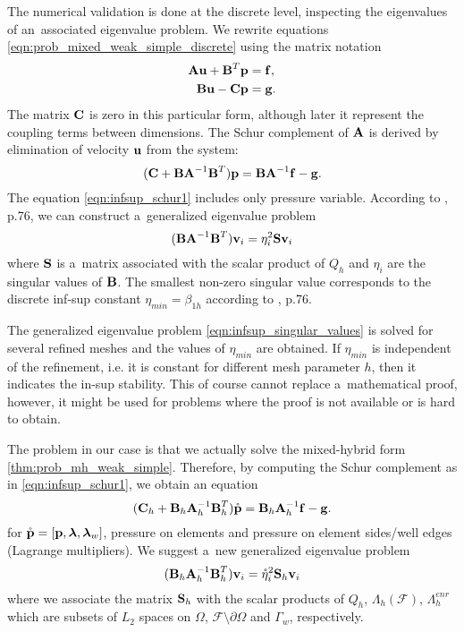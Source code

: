 The numerical validation is done at the discrete level, inspecting the eigenvalues of an~associated eigenvalue problem.
We rewrite equations \eqref{eqn:prob_mixed_weak_simple_discrete} using the matrix notation
\begin{align}
    \textbf{\textrm{A}} \textbf{\textrm{u}} + \textbf{\textrm{B}}^T\textbf{\textrm{p}} &= \textbf{\textrm{f}}, \\
    \textbf{\textrm{B}} \textbf{\textrm{u}} - \textbf{\textrm{C}}  \textbf{\textrm{p}} &= \textbf{\textrm{g}}.
\end{align}
The matrix $\textbf{\textrm{C}}$ is zero in this particular form, although later it represent the coupling terms between dimensions.
The Schur complement of $\textbf{\textrm{A}}$ is derived by elimination of velocity $\textbf{\textrm{u}}$ from the system:
\begin{equation} \label{eqn:infsup_schur1}
    (\textbf{\textrm{C}} + \textbf{\textrm{B}}\textbf{\textrm{A}}^{-1}\textbf{\textrm{B}}^T) \textbf{\textrm{p}} = \textbf{\textrm{B}} \textbf{\textrm{A}}^{-1} \textbf{\textrm{f}} - \textbf{\textrm{g}}.
\end{equation}
The equation \eqref{eqn:infsup_schur1} includes only pressure variable.
According to \cite{brezzi_mixed_1991}, p.76, we can construct a~generalized eigenvalue problem
\begin{equation} \label{eqn:infsup_singular_values}
    (\textbf{\textrm{B}}\textbf{\textrm{A}}^{-1}\textbf{\textrm{B}}^T) \textbf{\textrm{v}}_i = \eta^2_i \textbf{\textrm{S}} \textbf{\textrm{v}}_i
\end{equation}
where $\textbf{\textrm{S}}$ is a~matrix associated with the scalar product of $Q_h$ and $\eta_i$ are the singular values of $\textbf{\textrm{B}}$.
The smallest non-zero singular value corresponds to the discrete inf-sup constant $\eta_{min} = \beta_{1h}$
according to \cite{brezzi_mixed_1991}, p.76.

The generalized eigenvalue problem \eqref{eqn:infsup_singular_values} is solved for several refined meshes
and the values of $\eta_{min}$ are obtained. If $\eta_{min}$ is independent of the refinement, i.e.
it is constant for different mesh parameter $h$, then it indicates the in-sup stability.
This of course cannot replace a~mathematical proof, however, it might be used for problems where the proof is not available
or is hard to obtain.

The problem in our case is that we actually solve the mixed-hybrid form \eqref{thm:prob_mh_weak_simple}.
Therefore, by computing the Schur complement as in \eqref{eqn:infsup_schur1}, we obtain an equation
\begin{equation} \label{eqn:infsup_schur1_hybrid}
    (\textbf{\textrm{C}}_h + \textbf{\textrm{B}}_h\textbf{\textrm{A}}_h^{-1}\textbf{\textrm{B}}_h^T) \mathring{\textbf{\textrm{p}}} = \textbf{\textrm{B}}_h \textbf{\textrm{A}}_h^{-1} \textbf{\textrm{f}} - \textbf{\textrm{g}}.
\end{equation}
for $\mathring{\textbf{\textrm{p}}}=[\textbf{\textrm{p}},\mathbf{\boldsymbol{\lambda}},\mathbf{\boldsymbol{\lambda}}_w]$, pressure on elements and pressure on element sides/well edges (Lagrange multipliers).
We suggest a~new generalized eigenvalue problem
\begin{equation} \label{eqn:infsup_singular_values_hybrid}
    (\textbf{\textrm{B}}_h\textbf{\textrm{A}}_h^{-1}\textbf{\textrm{B}}_h^T) \textbf{\textrm{v}}_i = \mathring\eta^2_i \textbf{\textrm{S}}_h \textbf{\textrm{v}}_i
\end{equation}
where we associate the matrix $\textbf{\textrm{S}}_h$ with the scalar products of $Q_h$, $\Lambda_h(\mathcal{F})$, $\Lambda^{enr}_h$
which are subsets of $L_2$ spaces on $\Omega$, $\mathcal{F}\setminus\partial\Omega$ and $\Gamma_w$, respectively. 

